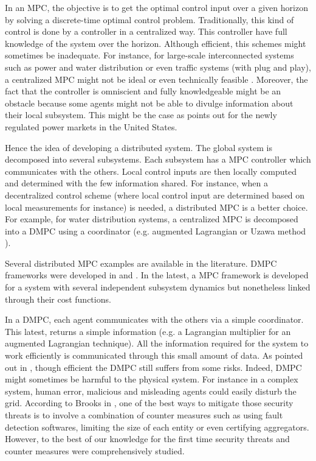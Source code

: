 \documentclass[conference]{IEEEtran}
\begin{document}
In an MPC, the objective is to get the optimal control input over a given horizon by solving a discrete-time optimal control problem. Traditionally, this kind of control is done by a controller in a centralized way.  This controller have full knowledge of the system over the horizon. Although efficient, this schemes might sometimes be inadequate. For instance,  for large-scale interconnected systems such as power and water distribution or even traffic systems (with plug and play), a centralized MPC might not be ideal or even technically feasible \cite{Jia}. Moreover, the fact that the controller is omniscient and  fully knowledgeable might be an obstacle because some agents might not be able to divulge information about their local subsystem. This might be the case as \cite{Campo} points out for the newly regulated power markets in the United States.

Hence the idea of developing a distributed system. The global system is decomposed into several subsystems. Each subsystem has a MPC controller which communicates with the others. Local control inputs are then locally computed and determined with the few information shared. For instance, when a decentralized control scheme (where local control input are determined based on local measurements for instance) is needed, a distributed MPC is a better choice. For example, for water distribution systems, a centralized MPC is decomposed into a DMPC using a coordinator (e.g. augmented Lagrangian \cite{Campo} or Uzawa method \cite{Cohen}).

Several distributed MPC examples are available in the literature. DMPC frameworks were developed in \cite{Acar, Sawa} and \cite{ Dunbar}. In the latest, a MPC framework is developed for a system with several independent subsystem dynamics but nonetheless linked through their cost functions. 

In a DMPC, each agent communicates with the others via a simple coordinator. This latest, returns a simple information (e.g. a Lagrangian multiplier for an augmented Lagrangian technique). All the information required for the system to work efficiently is communicated through this small amount of data. As pointed out  in \cite{Brooks}, though efficient the DMPC still suffers from some risks. Indeed, DMPC might sometimes be harmful to the physical system. For instance in a complex system, human error, malicious and misleading agents could easily disturb the grid. According to Brooks in \cite{Brooks}, one of the best ways to mitigate those security threats is to involve a combination of counter measures such as using fault detection softwares, limiting the size of each entity or even certifying aggregators. However, to the best of our knowledge for the first time security threats and counter measures were comprehensively studied. 
\end{document}
